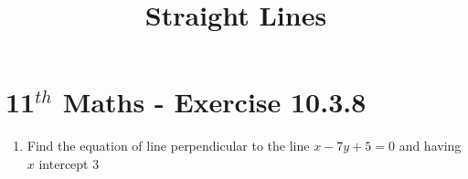 \documentclass[12pt]{article}
\begin{document}
\begin{center}
\title{\textbf{Straight Lines}}
\date{\vspace{-5ex}} %
\maketitle
\end{center}
\setcounter{page}{1}
\section{11$^{th}$ Maths - Exercise 10.3.8}

\begin{enumerate}
\item Find the equation of line perpendicular to the line $x-7y+5=0$ and having $x$ intercept $3$\\

\end{enumerate}
\end{document}
